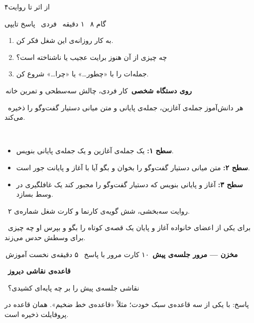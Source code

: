 \documentclass[11pt,a4paper]{article}
\newcommand{\en}[1]{\lr{#1}}
\newcommand{\dastehead}[3]{%
  \smallskip\noindent
  \colorbox{#3!12}{\textcolor{#3}{\textbf{\,#1\,}}}\hspace{0.5em}%
  \textcolor{#3}{\small #2}\par\nopagebreak\vspace{3pt}}
\newcommand{\lbl}[2]{\noindent{\small\textbf{\textcolor{#1}{#2}}}\ }
\begin{document}
\begin{jalasebox}{۴}{از اثر تا روایت}
\begin{stepbox}{گام ۸ \textbar\ ۱ دقیقه \textbar\ فردی \textbar\ پاسخ تایپی}
\begin{enumerate}[leftmargin=1.6em,itemsep=0pt,topsep=1pt]
\item به کار روزانه‌ی این شغل فکر کن.
\item چه چیزی از آن هنوز برایت عجیب یا ناشناخته است؟
\item جمله‌ات را با «چطور…» یا «چرا…» شروع کن.
\end{enumerate}
\par
{}\par
\vspace{5pt}
\end{stepbox}
\dastehead{روی دستگاه شخصی}{کار فردی، چالش سه‌سطحی و تمرین خانه}{mescol}
\lbl{mescol}{کار:}هر دانش‌آموز جمله‌ی آغازین، جمله‌ی پایانی و متن میانی دستیار گفت‌وگو را ذخیره می‌کند.\par
\lbl{mescol}{چالش سه‌سطحی:}\par
\begin{itemize}
\item \textbf{سطح ۱:} یک جمله‌ی آغازین و یک جمله‌ی پایانی بنویس.
\item \textbf{سطح ۲:} متن میانی دستیار گفت‌وگو را بخوان و بگو آیا با آغاز و پایانت جور است.
\item \textbf{سطح ۳:} آغاز و پایانی بنویس که دستیار گفت‌وگو را مجبور کند یک غافلگیری در وسط بسازد.
\end{itemize}
\lbl{mescol}{ثبت در پروفایل:}روایت سه‌بخشی، شش گویه‌ی کارنما و کارت شغل شماره‌ی ۲.\par
\lbl{mescol}{تمرین خانه:}برای یکی از اعضای خانواده آغاز و پایان یک قصه‌ی کوتاه را بگو و بپرس او چه چیزی برای وسطش حدس می‌زند.\par\vspace{4pt}
\dastehead{مخزن — مرور جلسه‌ی پیش}{۱۰ کارت مرور با پاسخ \textbar\ ۵ دقیقه‌ی نخست آموزش}{morcol}
\lbl{stepcol}{\en{G6-S04-R01}}\textbf{قاعده‌ی نقاشی دیروز}\par
\noindent{\small\textcolor{tchcol}{صفحه:}}\ نقاشی جلسه‌ی پیش را بر چه پایه‌ای کشیدی؟\par\noindent \par\noindent پاسخ: با یکی از سه قاعده‌ی سبک خودت؛ مثلاً «قاعده‌ی خط ضخیم». همان قاعده در پروفایلت ذخیره است.\par

\end{jalasebox}
\end{document}
